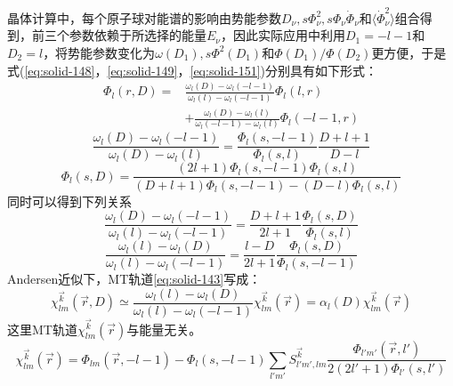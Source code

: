 晶体计算中，每个原子球对能谱的影响由势能参数$D_{\nu},s\Phi_{\nu}^2,s\Phi_{\nu}\dot\Phi_{\nu}$和$\langle\dot\Phi_{\nu}^2\rangle$组合得到，前三个参数依赖于所选择的能量$E_{\nu}$，因此实际应用中利用$D_1=-l-1$和$D_2=l$，将势能参数变化为$\omega(D_1),s\Phi^2(D_1)$和$\Phi(D_1)/\Phi(D_2)$更方便，于是式(\ref{eq:solid-148}，\ref{eq:solid-149}，\ref{eq:solid-151})分别具有如下形式：%
\begin{equation}
  \begin{split}
   \Phi_l(r,D)=&\frac{\omega_l(D)-\omega_l(-l-1)}{\omega_l(l)-\omega_l(-l-1)}\Phi_l(l,r)\\
   &+\frac{\omega_l(D)-\omega_l(l)}{\omega_l(-l-1)-\omega_l(l)}\Phi_l(-l-1,r)
  \end{split}
  \label{eq:solid-156}
\end{equation}
\begin{equation}
  \frac{\omega_l(D)-\omega_l(-l-1)}{\omega_l(D)-\omega_l(l)}=\frac{\Phi_l(s,-l-1)}{\Phi_l(s,l)}\frac{D+l+1}{D-l}
  \label{eq:solid-157}
\end{equation}
\begin{equation}
  \Phi_l(s,D)=\frac{(2l+1)\Phi_l(s,-l-1)\Phi_l(s,l)}{(D+l+1)\Phi_l(s,-l-1)-(D-l)\Phi_l(s,l)}
  \label{eq:solid-158}
\end{equation}
同时可以得到下列关系
\begin{equation}
  \frac{\omega_l(D)-\omega_l(-l-1)}{\omega_l(l)-\omega_l(-l-1)}=\frac{D+l+1}{2l+1}\frac{\Phi_l(s,D)}{\Phi_l(s,l)}
  \label{eq:solid-159}
\end{equation}
\begin{equation}
  \frac{\omega_l(l)-\omega_l(D)}{\omega_l(l)-\omega_l(-l-1)}=\frac{l-D}{2l+1}\frac{\Phi_l(s,D)}{\Phi_l(s,-l-1)}
  \label{eq:solid-160}
\end{equation}
Andersen近似下，MT轨道\eqref{eq:solid-143}写成：
\begin{equation}
  \chi_{lm}^{\vec k}(\vec r,D)\simeq\frac{\omega_l(l)-\omega_l(D)}{\omega_l(l)-\omega_l(-l-1)}\chi_{lm}^{\vec k}(\vec r)=\alpha_l(D)\chi_{lm}^{\vec k}(\vec r)
  \label{eq:solid-161}
\end{equation}
这里MT轨道$\chi_{lm}^{\vec k}(\vec r)$与能量无关。
\begin{equation}
  \chi_{lm}^{\vec k}(\vec r)=\Phi_{lm}(\vec r,-l-1)-\Phi_l(s,-l-1)\sum_{l'm'}S_{l'm',lm}^{\vec k}\frac{\Phi_{l'm'}(\vec r,l')}{2(2l'+1)\Phi_{l'}(s,l')}
  \label{eq:solid-162}
\end{equation}
